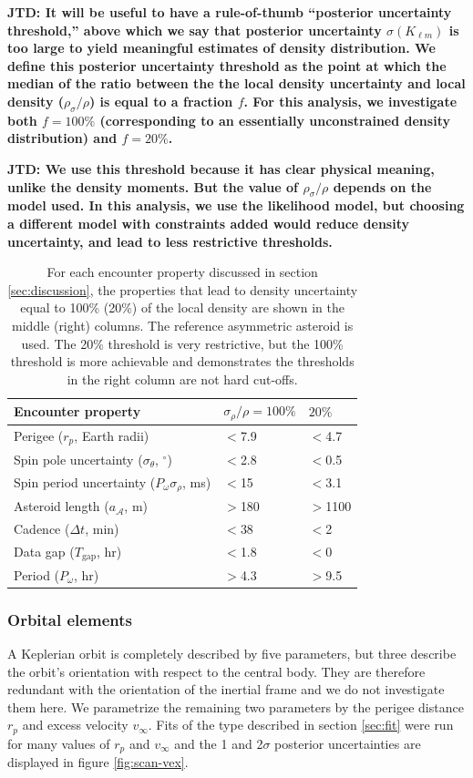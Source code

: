 \documentclass[fleqn,usenatbib]{mnras}
\newcommand{\jtd}[1]{ {\bf{\color{red} JTD: #1}} }
\begin{document}
\jtd{It will be useful to have a rule-of-thumb ``posterior uncertainty threshold,'' above which we say that posterior uncertainty $\sigma(K_{\ell m})$ is too large to yield meaningful estimates of density distribution. We define this posterior uncertainty threshold as the point at which the median of the ratio between the the local density uncertainty and local density  ($\rho_\sigma / \rho$) is equal to a fraction $f$. For this analysis, we investigate both $f=100\%$ (corresponding to an essentially unconstrained density distribution) and $f=20\%$.}

\jtd{We use this threshold because it has clear physical meaning, unlike the density moments. But the value of $\rho_\sigma / \rho$ depends on the model used. In this analysis, we use the likelihood model, but choosing a different model with constraints added would reduce density uncertainty, and lead to less restrictive thresholds.}

\begin{table}
  \centering
  \begin{tabular}{lll} \hline
    Encounter property & $\sigma_\rho / \rho = 100\%$ & $20\%$ \\ \hline
    Perigee ($r_p$, Earth radii) & $<$7.9 & $<$4.7 \\
    Spin pole uncertainty ($\sigma_\theta$, $^\circ$) & $<$2.8 & $<$0.5 \\
    Spin period uncertainty ($P_\omega \sigma_\rho$, ms) & $<$15 & $<$3.1\\
    Asteroid length ($a_\mathcal{A}$, m) & $>$180 & $>$1100 \\
    Cadence ($\Delta t$, min) & $<$38 & $<$2 \\
    Data gap ($T_\text{gap}$, hr) & $<$1.8 & $<$0 \\
    Period ($P_\omega$, hr) & $>$4.3 & $>$9.5\\ \hline
  \end{tabular}
  \caption{For each encounter property discussed in section \ref{sec:discussion}, the properties that lead to density uncertainty equal to 100\% (20\%) of the local density are shown in the middle (right) columns. The reference asymmetric asteroid is used. The 20\% threshold is very restrictive, but the 100\% threshold is more achievable and demonstrates the thresholds in the right column are not hard cut-offs.}
  \label{tab:threshold-summary}
\end{table}


\subsubsection{Orbital elements}
\label{sec:scan-orbit}
A Keplerian orbit is completely described by five parameters, but three describe the orbit's orientation with respect to the central body. They are therefore redundant with the orientation of the inertial frame and we do not investigate them here. We parametrize the remaining two parameters by the perigee distance $r_p$ and excess velocity $v_\infty$. Fits of the type described in section \ref{sec:fit} were run for many values of $r_p$ and $v_\infty$ and the 1 and 2$\sigma$ posterior uncertainties are displayed in figure \ref{fig:scan-vex}.
\end{document}

